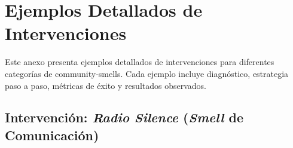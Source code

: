 \chapter{Ejemplos Detallados de Intervenciones}
\label{anexo:ejemplos-intervenciones}

Este anexo presenta ejemplos detallados de intervenciones para diferentes categorías de \gls{community-smells}. Cada ejemplo incluye diagnóstico, estrategia paso a paso, métricas de éxito y resultados observados.

\section{Intervención: \textit{Radio Silence} (\textit{Smell} de Comunicación)}

\begingroup
\scriptsize
\renewcommand{\arraystretch}{1.4}
\setlength{\tabcolsep}{4pt}
\setlength{\LTleft}{0pt}
\setlength{\LTright}{0pt}

